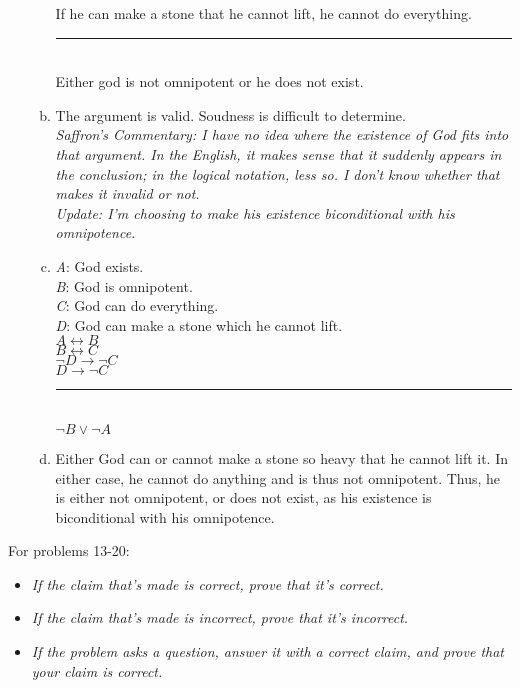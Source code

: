 \documentclass{article}
\begin{document}
\begin{enumerate}
\begin{enumerate}[(a)]
                        If he can make a stone that he cannot lift, he cannot do everything.\\
                        \rule{15em}{.5pt}\\
                        Either god is not omnipotent or he does not exist.
                  \item The argument is valid. Soudness is difficult to determine.\\
                        \textit{Saffron's Commentary: I have no idea where the existence of God fits into that argument. In the English, it makes sense that it suddenly appears in the conclusion; in the logical notation, less so. I don't know whether that makes it invalid or not.\\
                              Update: I'm choosing to make his existence biconditional with his omnipotence.}
                  \item \textit{A}: God exists.\\
                        \textit{B}: God is omnipotent.\\
                        \textit{C}: God can do everything.\\
                        \textit{D}: God can make a stone which he cannot lift.\\

                        $A \leftrightarrow B$\\
                        $B \leftrightarrow C$\\
                        $\neg D \to \neg C$\\
                        $D \to \neg C$\\
                        \rule{5em}{.5pt}\\
                        $\neg B \lor \neg A$
                  \item Either God can or cannot make a stone so heavy that he cannot lift it. In either case, he cannot do anything and is thus not omnipotent. Thus, he is either not omnipotent, or does not exist, as his existence is biconditional with his omnipotence.
            \end{enumerate}
\end{enumerate}

\begin{flushleft}
      For problems 13-20:
\end{flushleft}

\begin{itemize}
      \item \textit{If the claim that's made is correct, prove that it's correct.}
      \item \textit{If the claim that's made is incorrect, prove that it's incorrect.}
      \item \textit{If the problem asks a question, answer it with a correct claim, and prove that your
                  claim is correct.}
\end{itemize}
\end{document}
